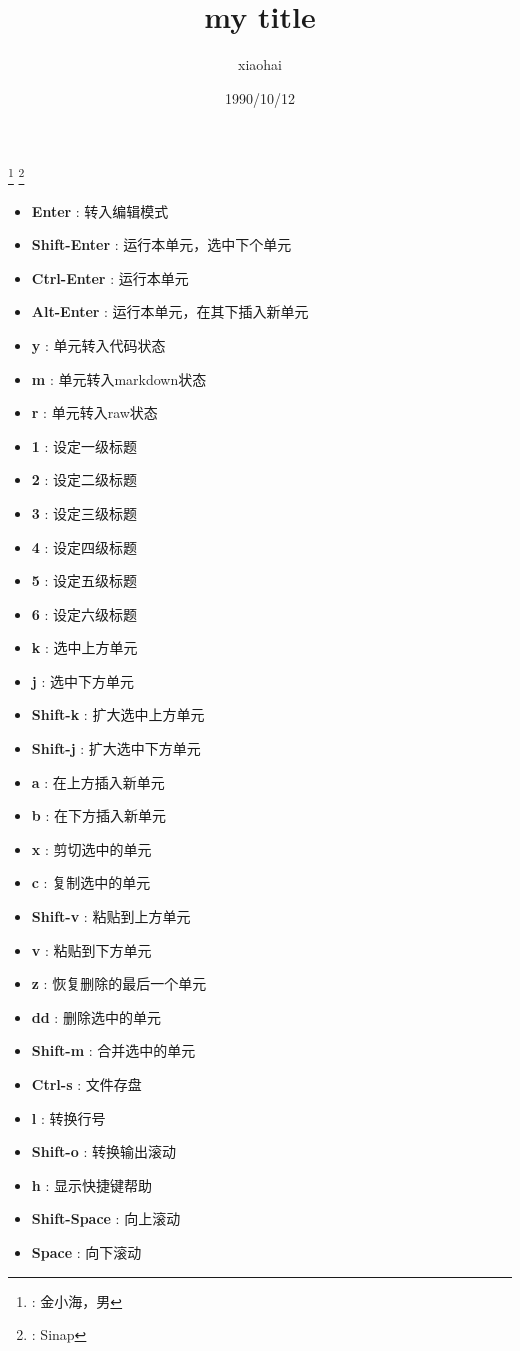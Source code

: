 \documentclass[11pt,UTF8,hyperref,openany]{ctexbook}
\author{xiaohai}
\date{1990/10/12}
\title{my title}
\begin{document}
\renewcommand{\thefootnote}{}
\footnote{: 金小海，男}
\footnote{: Sinap}
\setcounter{footnote}{0}
\renewcommand{\thefootnote}{\arabic{footnote}}
\begin{itemize}
\item \textbf{Enter} : 转入编辑模式
\item {\textbf{Shift-Enter} : 运行本单元，选中下个单元}
\item {\textbf{Ctrl-Enter} : 运行本单元}
\item {\textbf{Alt-Enter} : 运行本单元，在其下插入新单元}
\item {\textbf{y} : 单元转入代码状态}
\item {\textbf{m} : 单元转入markdown状态}
\item {\textbf{r} : 单元转入raw状态}
\item {\textbf{1} : 设定一级标题}
\item {\textbf{2} : 设定二级标题}
\item {\textbf{3} : 设定三级标题}
\item {\textbf{4} : 设定四级标题}
\item {\textbf{5} : 设定五级标题}
\item {\textbf{6} : 设定六级标题}
\item {\textbf{k} : 选中上方单元}
\item {\textbf{j} : 选中下方单元}
\item {\textbf{Shift-k} : 扩大选中上方单元}
\item {\textbf{Shift-j} : 扩大选中下方单元}
\item {\textbf{a} : 在上方插入新单元}
\item {\textbf{b} : 在下方插入新单元}
\item {\textbf{x} : 剪切选中的单元}
\item {\textbf{c} : 复制选中的单元}
\item {\textbf{Shift-v} : 粘贴到上方单元}
\item {\textbf{v} : 粘贴到下方单元}
\item {\textbf{z} : 恢复删除的最后一个单元}
\item {\textbf{dd} : 删除选中的单元}
\item {\textbf{Shift-m} : 合并选中的单元}
\item {\textbf{Ctrl-s} : 文件存盘}
\item {\textbf{l} : 转换行号}
\item {\textbf{Shift-o} : 转换输出滚动}
\item {\textbf{h} : 显示快捷键帮助}
\item {\textbf{Shift-Space} : 向上滚动}
\item {\textbf{Space} : 向下滚动}
\end{itemize}
\end{document}
